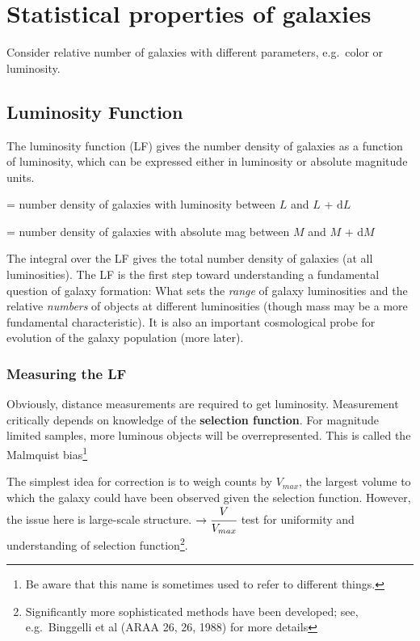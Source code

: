 \documentclass{article}
\begin{document}
\newpage
\section{Statistical properties of galaxies}
Consider relative number of galaxies with different parameters,
e.g.\ color or luminosity.
\subsection{Luminosity Function}
The luminosity function (LF) gives the number density of galaxies as a
function of luminosity, which can be expressed either in luminosity or
absolute magnitude units.
\begin{description}[labelwidth=3em, labelindent=0.25in]
    \item [$\Phi(L)$] = number density of galaxies with
        luminosity between $L$ and $L$ + $\mathrm{d}L$
    \item [$\Phi(M)$] = number density of galaxies with absolute
        mag between $M$ and $M$ + $\mathrm{d}M$
\end{description}
The integral over the LF gives the total number density of galaxies (at all
luminosities). The LF is the first step toward understanding a fundamental
question of galaxy formation: What sets the \emph{range} of galaxy luminosities
and the relative \emph{numbers} of objects at different luminosities (though
mass may be a more fundamental characteristic). It is also an important
cosmological probe for evolution of the galaxy population (more later).

\subsubsection{Measuring the LF}
Obviously, distance measurements are required to get luminosity.
Measurement critically depends on knowledge of the \textbf{selection
function}. For magnitude limited samples, more luminous objects will
be overrepresented. This is called the Malmquist bias\footnote{Be
aware that this name is sometimes used to refer to different things.}

The simplest idea for correction is to weigh counts by $V_{max}$, the
largest volume to which the galaxy could have been observed given the
selection function. However, the issue here is large-scale structure.
$\rightarrow \cfrac{V}{V_{max}}$ test for uniformity and understanding
of selection function\footnote{Significantly more sophisticated
methods have been developed; see, e.g.\ Binggelli et al (ARAA 26, 26,
1988) for more details}.
\end{document}
